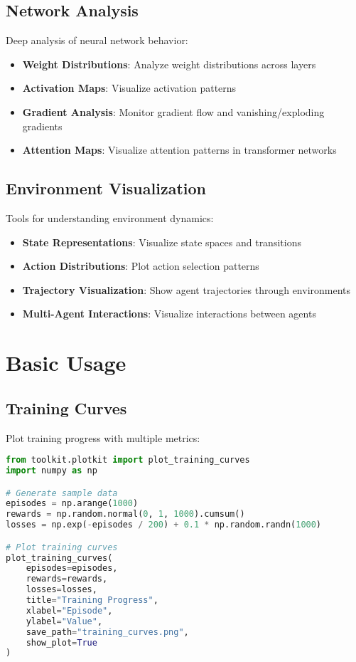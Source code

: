 \subsection{Network Analysis}

Deep analysis of neural network behavior:

\begin{itemize}
    \item \textbf{Weight Distributions}: Analyze weight distributions across layers
    \item \textbf{Activation Maps}: Visualize activation patterns
    \item \textbf{Gradient Analysis}: Monitor gradient flow and vanishing/exploding gradients
    \item \textbf{Attention Maps}: Visualize attention patterns in transformer networks
\end{itemize}

\subsection{Environment Visualization}

Tools for understanding environment dynamics:

\begin{itemize}
    \item \textbf{State Representations}: Visualize state spaces and transitions
    \item \textbf{Action Distributions}: Plot action selection patterns
    \item \textbf{Trajectory Visualization}: Show agent trajectories through environments
    \item \textbf{Multi-Agent Interactions}: Visualize interactions between agents
\end{itemize}

\section{Basic Usage}

\subsection{Training Curves}

Plot training progress with multiple metrics:

\begin{lstlisting}[language=python, caption=Training Curves Example]
from toolkit.plotkit import plot_training_curves
import numpy as np

# Generate sample data
episodes = np.arange(1000)
rewards = np.random.normal(0, 1, 1000).cumsum()
losses = np.exp(-episodes / 200) + 0.1 * np.random.randn(1000)

# Plot training curves
plot_training_curves(
    episodes=episodes,
    rewards=rewards,
    losses=losses,
    title="Training Progress",
    xlabel="Episode",
    ylabel="Value",
    save_path="training_curves.png",
    show_plot=True
)
\end{lstlisting}

